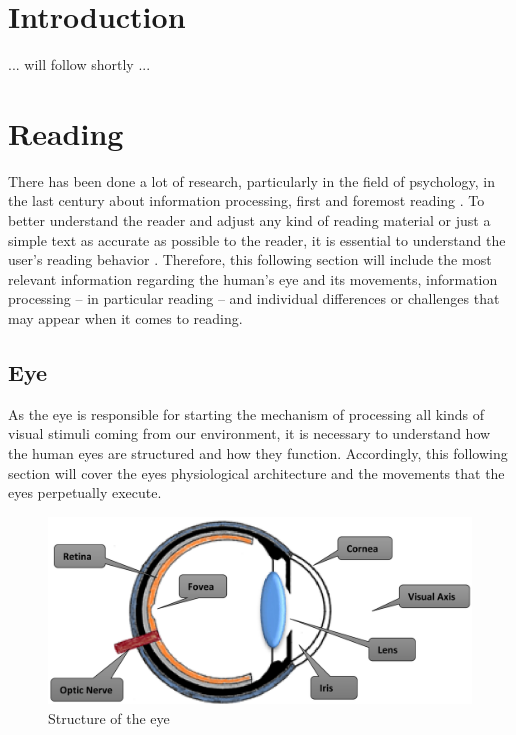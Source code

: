 \section{Introduction}
\label{section:Introduction}
... will follow shortly ...

\section{Reading}
\label{section:Reading}

There has been done a lot of research, particularly in the field of psychology, in the last century about information processing, first and foremost reading \autocite{rayner1998eye, biedert2010eyebook}. 
To better understand the reader and adjust any kind of reading material or just a simple text as accurate as possible to the reader, it is essential to understand the user's reading behavior \autocite{biedert2010eyebook}. 
Therefore, this following section will include the most relevant information regarding the human's eye and its movements, information processing -- in particular reading -- and individual differences or challenges that may appear when it comes to reading.

\subsection{Eye}
\label{subsection:Eye}
As the eye is responsible for starting the mechanism of processing all kinds of visual stimuli coming from our environment, it is necessary to understand how the human eyes are structured and how they function. Accordingly, this following section will cover the eyes physiological architecture and the movements that the eyes perpetually execute.

\begin{figure}[!ht]
    \centering
    \includegraphics[width=0.75\linewidth]{images/Eye_djamasbi2014eye.png}
    \caption{
       Structure of the eye \autocite[38]{djamasbi2014eye}
    }
    \label{figure:Eye}
\end{figure}

